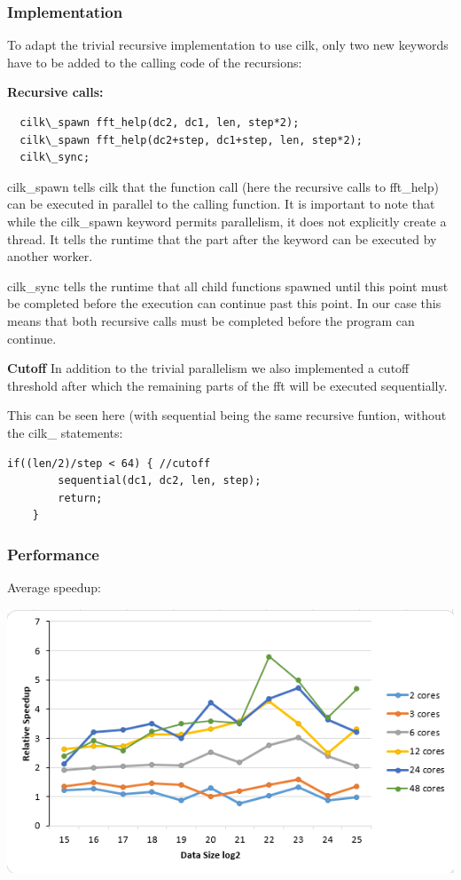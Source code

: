 \subsubsection{Implementation}
To adapt the trivial recursive implementation to use cilk, only two new keywords have to be added to the calling code of the recursions:

\textbf{Recursive calls:}
\begin{lstlisting}
  cilk\_spawn fft_help(dc2, dc1, len, step*2);
  cilk\_spawn fft_help(dc2+step, dc1+step, len, step*2);
  cilk\_sync;
\end{lstlisting}

cilk\_spawn tells cilk that the function call (here the recursive calls to fft\_help) can be executed in parallel to the calling function. It is important to note that while the cilk\_spawn keyword permits parallelism, it does not explicitly create a thread. It tells the runtime that the part after the keyword can be executed by another worker. 

cilk\_sync  tells the runtime that all child functions spawned until this point must be completed before the execution can continue past this point. In our case this means that both recursive calls must be completed before the program can continue. 

\textbf{Cutoff}
In addition to the trivial parallelism we also implemented a cutoff threshold after which the remaining parts of the fft will be executed sequentially. 

This can be seen here (with sequential being the same recursive funtion, without the cilk\_ statements: 
\begin{lstlisting}
if((len/2)/step < 64) { //cutoff
		sequential(dc1, dc2, len, step);
		return;
	}
\end{lstlisting}

\subsubsection{Performance}

Average speedup:

\includegraphics[width=\textwidth]{cilk_rec_avg.png}

